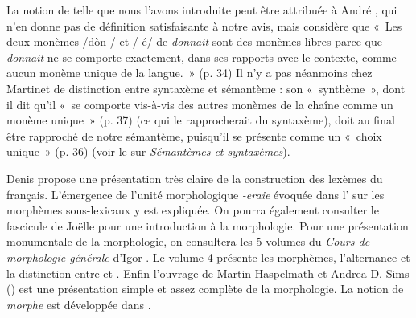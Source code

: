 {    La notion de  telle que nous l’avons introduite peut être attribuée à André \citet{martinet1985syntaxe}, qui n’en donne pas de définition satisfaisante à notre avis, mais considère que «~Les deux monèmes /dòn-/ et /-é/ de \textit{donnait} sont des monèmes libres parce que \textit{donnait} ne se comporte exactement, dans ses rapports avec le contexte, comme aucun monème unique de la langue.~» (p. 34) Il n’y a pas néanmoins chez Martinet de distinction entre syntaxème et sémantème : son «~synthème~», dont il dit qu’il «~se comporte vis-à-vis des autres monèmes de la chaîne comme un monème unique~» (p. 37) (ce qui le rapprocherait du syntaxème), doit au final être rapproché de notre sémantème, puisqu’il se présente comme un «~choix unique~» (p. 36) (voir le  sur \textit{Sémantèmes et syntaxèmes}).

    Denis \citet{apotheloz2002construction} propose une présentation très claire de la construction des lexèmes du français. L’émergence de l'unité morphologique \textit{{}-eraie} évoquée dans l' sur les morphèmes sous-lexicaux y est expliquée. On pourra également consulter le fascicule de Joëlle \citet{gardes-tamine1990grammaire} pour une introduction à la morphologie. Pour une présentation monumentale de la morphologie, on consultera les 5 volumes du \textit{Cours de morphologie générale} d’Igor \citet{melcuk1993cours}. Le volume 4 présente les morphèmes, l’alternance et la distinction entre  et . Enfin l'ouvrage de Martin Haspelmath et Andrea D. Sims (\citeyear{haspelmath2013understanding}) est une présentation simple et assez complète de la morphologie. La notion de \textit{morphe} est développée dans \citet{haspelmath2020morph}.

}
